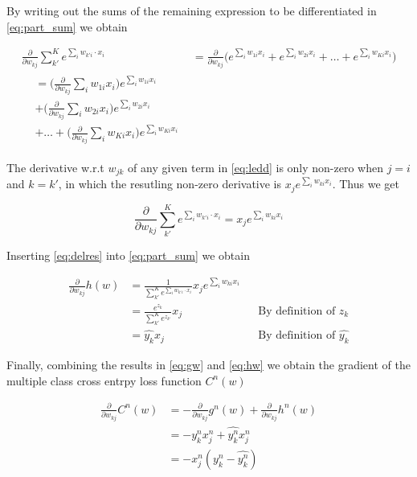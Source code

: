 \documentclass{article}
\begin{document}
By writing out the sums of the remaining expression to be differentiated in \eqref{eq:part_sum} we obtain

\begin{align}
     \frac{\partial }{\partial w_{kj}} \sum_{k'}^Ke^{\sum_{i} w_{k'i} \cdot x_i} &=  \frac{\partial }{\partial w_{kj}} \bigg(  e^{\sum_i w_{1i}x_i} + e^{\sum_i w_{2i}x_i} + \dots + e^{\sum_i w_{Ki}x_i}\bigg) \\
     \begin{split}
     &= \Big(\frac{\partial }{\partial w_{kj}} \sum_i w_{1i}x_i \Big)e^{\sum_i w_{1i}x_i} \\ 
     &+ \Big(\frac{\partial }{\partial w_{kj}} \sum_i w_{2i}x_i \Big)e^{\sum_i w_{2i}x_i} \\
     & + \dots + \Big(\frac{\partial }{\partial w_{kj}} \sum_i w_{Ki}x_i \Big)e^{\sum_i w_{Ki}x_i} \label{eq:ledd}
     \end{split}
\end{align}

The derivative w.r.t $w_{jk}$ of any given term in \eqref{eq:ledd} is only non-zero when $j=i$ and $k = k'$, in which the resutling non-zero derivative is $x_j e^{\sum_i w_{ki}x_i}$. Thus we get

\begin{equation}
    \frac{\partial }{\partial w_{kj}} \sum_{k'}^Ke^{\sum_{i} w_{k'i} \cdot x_i} = x_j e^{\sum_i w_{ki}x_i}
    \label{eq:delres}
\end{equation}

Inserting \eqref{eq:delres} into \eqref{eq:part_sum} we obtain

\begin{align}
    \frac{\partial }{\partial w_{kj}} h(w) &= \frac{1}{\sum_{k'}^Ke^{\sum_{i} w_{k'i} \cdot x_i}} x_j e^{\sum_i w_{ki}x_i} \\
    &= \frac{e^{z_k}}{\sum_{k'}^K e^{z_{k'}}} x_j && \text{By definition of $z_k$} \\
    &= \hat{y_k}x_j && \text{By definition of $\hat{y_k}$} \label{eq:hw}
\end{align}

Finally, combining the results in \eqref{eq:gw} and \eqref{eq:hw} we obtain the gradient of the multiple class cross entrpy loss function $C^n(w)$

\begin{align}
   \frac{\partial }{\partial w_{kj}} C^n(w) &=-\frac{\partial }{\partial w_{kj}} g^n(w) + \frac{\partial }{\partial w_{kj}} h^n(w)  \\
   &= -y_k^n x_j^n + \hat{y_k^n}x_j^n \\
   &= -x_j^n(y_k^n - \hat{y_k^n})
\end{align}
\end{document}
